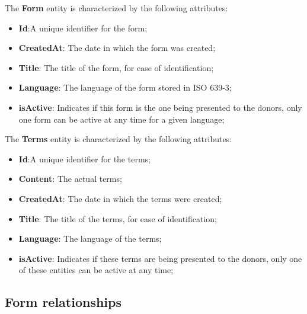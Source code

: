 The \textbf{Form} entity is characterized by the following attributes:
\begin{itemize}
	\item \textbf{Id}:A unique identifier for the form;
	\item \textbf{CreatedAt}: The date in which the form was created;
	\item \textbf{Title}: The title of the form, for ease of identification;
	\item \textbf{Language}: The language of the form stored in ISO 639-3;
	\item \textbf{isActive}: Indicates if this form is the one being presented to the donors, only one form can be active at any time for a given language;
\end{itemize}

The \textbf{Terms} entity is characterized by the following attributes:
\begin{itemize}
	\item \textbf{Id}:A unique identifier for the terms;
	\item \textbf{Content}: The actual terms;
	\item \textbf{CreatedAt}: The date in which the terms were created;
	\item \textbf{Title}: The title of the terms, for ease of identification;
	\item \textbf{Language}: The language of the terms;
	\item \textbf{isActive}: Indicates if these terms are being presented to the donors, only one of these entities can be active at any time;
\end{itemize}





\subsection{Form relationships}\label{sec:form}

